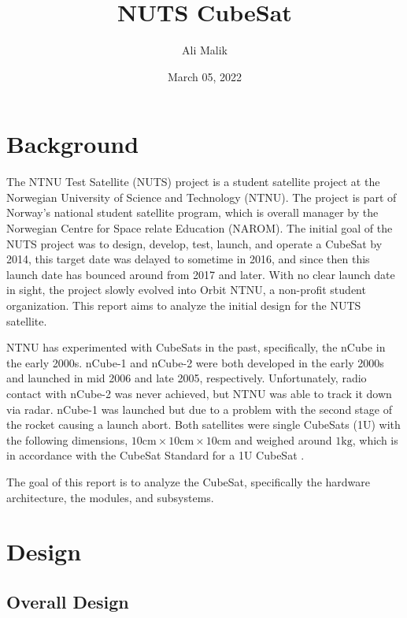 \documentclass[12pt, a4paper]{report}
\title{\textbf{\Large{NUTS CubeSat}}}
\author{Ali Malik}
\date{March 05, 2022}
\begin{document}
\maketitle

\tableofcontents
\newpage
\listoffigures


\chapter{Background}

The NTNU Test Satellite (NUTS) project is a student satellite project at the Norwegian University of Science and Technology (NTNU). The project is part of Norway's national student satellite program, which is overall manager by the Norwegian Centre for Space relate Education (NAROM)\cite{overview}. The initial goal of the NUTS project was to design, develop, test, launch, and operate a CubeSat by 2014, this target date was delayed to sometime in 2016, and since then this launch date has bounced around from 2017 and later. With no clear launch date in sight, the project slowly evolved into Orbit NTNU, a non-profit student organization. This report aims to analyze the initial design for the NUTS satellite.

NTNU has experimented with CubeSats in the past, specifically, the nCube in the early 2000s. nCube-1 and nCube-2 were both developed in the early 2000s and  launched in mid 2006 and late 2005, respectively. Unfortunately, radio contact with nCube-2 was never achieved, but NTNU was able to track it down via radar. nCube-1 was launched but due to a problem with the second stage of the rocket causing a launch abort. Both satellites were single CubeSats (1U) with the following dimensions, \(10 \unit{\centi\meter} \times 10 \unit{\centi\meter} \times 10 \unit{\centi\meter}\) and weighed around \(1 \unit{\kilo\gram}\), which is in accordance with the CubeSat Standard for a 1U CubeSat \cite{cubesat_standard}.

The goal of this report is to analyze the CubeSat, specifically the hardware architecture, the modules, and subsystems.

\chapter{Design}

\section{Overall Design}
\end{document}
